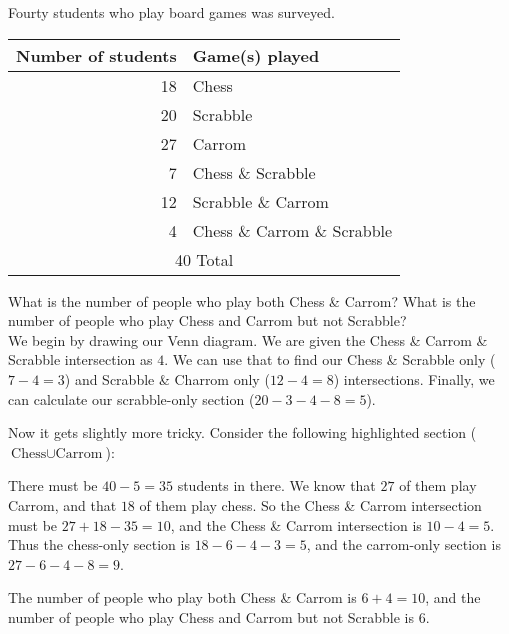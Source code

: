 \begin{boxexample}{}{}
	Fourty students who play board games was surveyed.

	\medskip
	\begin{tabular}{r|l}
		\hline
		Number of students & Game(s) played\\
		\hline
		18 & Chess\\
		20 & Scrabble\\
		27 & Carrom\\
		7  & Chess \& Scrabble\\
		12 & Scrabble \& Carrom\\
		4  & Chess \& Carrom \& Scrabble\\
		\hline
		\multicolumn{2}{c}{40 Total}\\
		\hline
	\end{tabular}
	\medskip

	What is the number of people who play both Chess \& Carrom? What is the number of people who play Chess and Carrom but not Scrabble?\\

	We begin by drawing our Venn diagram. We are given the Chess \& Carrom \& Scrabble intersection as $4$. We can use that to find our Chess \& Scrabble only ($7-4=3$) and Scrabble \& Charrom only ($12-4=8$) intersections. Finally, we can calculate our scrabble-only section ($20-3-4-8=5$).

	\begin{venndiagram3sets}[shade=skyblue,showframe=false,labelA={Chess},labelB={Scrabble},labelC={Carrom},labelABC={4},labelOnlyAB={3},labelOnlyBC={8},labelOnlyB={5}]
	\end{venndiagram3sets}

	Now it gets slightly more tricky. Consider the following highlighted section ($\text{Chess} \cup \text{Carrom}$):

	\begin{venndiagram3sets}[shade=skyblue,showframe=false,labelA={Chess},labelB={Scrabble},labelC={Carrom},labelABC={4},labelOnlyAB={3},labelOnlyBC={8},labelOnlyB={5}]
		\fillA \fillC
	\end{venndiagram3sets}

	There must be $40-5=35$ students in there. We know that $27$ of them play Carrom, and that $18$ of them play chess. So the Chess \& Carrom intersection must be $27+18-35=10$, and the Chess \& Carrom intersection is $10-4=5$. Thus the chess-only section is $18-6-4-3=5$, and the carrom-only section is $27-6-4-8=9$.

	\begin{venndiagram3sets}[shade=skyblue,showframe=false,labelA={Chess},labelB={Scrabble},labelC={Carrom},labelABC={4},labelOnlyAB={3},labelOnlyBC={8},labelOnlyB={5},labelOnlyAC={6},labelOnlyA={5},labelOnlyC={9}]
	\end{venndiagram3sets}

	The number of people who play both Chess \& Carrom is $6+4=10$, and the number of people who play Chess and Carrom but not Scrabble is $6$.
\end{boxexample}
